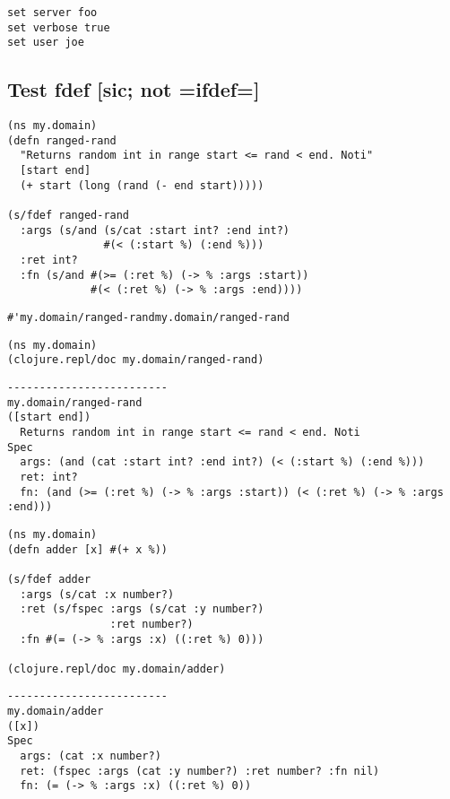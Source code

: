 \documentclass[10pt,oneside,x11names]{article}
\begin{document}
\begin{verbatim}
set server foo
set verbose true
set user joe
\end{verbatim}

\subsection{Test fdef [sic; not =ifdef=]}
\label{sec:orgbf4bd04}

\begin{verbatim}
(ns my.domain)
(defn ranged-rand
  "Returns random int in range start <= rand < end. Noti"
  [start end]
  (+ start (long (rand (- end start)))))

(s/fdef ranged-rand
  :args (s/and (s/cat :start int? :end int?)
               #(< (:start %) (:end %)))
  :ret int?
  :fn (s/and #(>= (:ret %) (-> % :args :start))
             #(< (:ret %) (-> % :args :end))))
\end{verbatim}

\begin{verbatim}
#'my.domain/ranged-randmy.domain/ranged-rand
\end{verbatim}


\begin{verbatim}
(ns my.domain)
(clojure.repl/doc my.domain/ranged-rand)
\end{verbatim}

\begin{verbatim}
-------------------------
my.domain/ranged-rand
([start end])
  Returns random int in range start <= rand < end. Noti
Spec
  args: (and (cat :start int? :end int?) (< (:start %) (:end %)))
  ret: int?
  fn: (and (>= (:ret %) (-> % :args :start)) (< (:ret %) (-> % :args :end)))
\end{verbatim}


\begin{verbatim}
(ns my.domain)
(defn adder [x] #(+ x %))

(s/fdef adder
  :args (s/cat :x number?)
  :ret (s/fspec :args (s/cat :y number?)
                :ret number?)
  :fn #(= (-> % :args :x) ((:ret %) 0)))

(clojure.repl/doc my.domain/adder)
\end{verbatim}

\begin{verbatim}
-------------------------
my.domain/adder
([x])
Spec
  args: (cat :x number?)
  ret: (fspec :args (cat :y number?) :ret number? :fn nil)
  fn: (= (-> % :args :x) ((:ret %) 0))
\end{verbatim}
\end{document}
